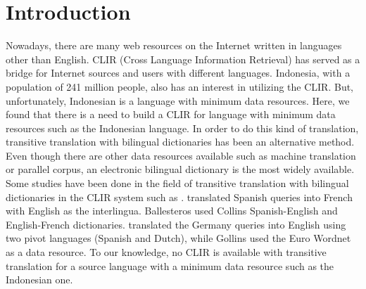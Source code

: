 \documentclass[english]{jnlp_1.3c}
\begin{document}
\maketitle





\section{Introduction}
\label{Intoroduction}

Nowadays, there are many web resources on the Internet written in
languages other than English. CLIR (Cross Language Information
Retrieval) has served as a bridge for Internet sources and users with
different languages. Indonesia, with a population of 241 million people,
also has an interest in utilizing the CLIR. But, unfortunately,
Indonesian is a language with minimum data resources. Here, we found
that there is a need to build a CLIR for language with minimum data
resources such as the Indonesian language. In order to do this kind of
translation, transitive translation with bilingual dictionaries has been
an alternative method. Even though there are other data resources
available such as machine translation or parallel corpus, an electronic
bilingual dictionary is the most widely available. Some studies have
been done in the field of transitive translation with bilingual
dictionaries in the CLIR system such as
\cite{ballesteros2000,gollins2001}. \cite{ballesteros2000} translated
Spanish queries into French with English as the interlingua. Ballesteros
used Collins Spanish-English and English-French
dictionaries. \cite{gollins2001} translated the Germany queries into
English using two pivot languages (Spanish and Dutch), while Gollins
used the Euro Wordnet as a data resource. To our knowledge, no CLIR is
available with transitive translation for a source language with a
minimum data resource such as the Indonesian one.
\end{document}
